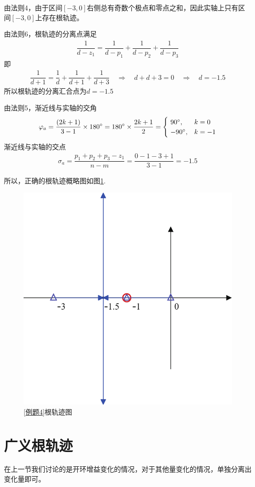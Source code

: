 由法则4，由于区间$[-3,0]$右侧总有奇数个极点和零点之和，因此实轴上只有区间$[-3,0]$上存在根轨迹。

由法则6，根轨迹的分离点满足
\begin{align*}
	\dfrac{1}{d - z_1} = \dfrac{1}{d - p_1} + \dfrac{1}{d - p_2} + \dfrac{1}{d - p_3}
\end{align*}
即
\begin{align*}
	\dfrac{1}{d +1} = \dfrac{1}{d} + \dfrac{1}{d + 1} + \dfrac{1}{d + 3} \quad \Rightarrow \quad 
	d + d + 3 = 0 \quad \Rightarrow \quad d = -1.5
\end{align*}
所以根轨迹的分离汇合点为$d = -1.5$

由法则5，渐近线与实轴的交角
\begin{align*}
	\varphi_a = \dfrac{(2k + 1)}{3 - 1} \times 180{}^{\circ} =180{}^{\circ}\times \dfrac{2k + 1}{2} = 
	\begin{cases}
		\,\, 90{}^{\circ}, &k = 0\\
		\,\, -90 {}^{\circ}, & k = -1
	\end{cases} 
\end{align*}
渐近线与实轴的交点
\begin{align*}
	\sigma_a = \dfrac{p_1 + p_2 + p_3 - z_1}{n - m} = \dfrac{0 -1 - 3 +1}{3 - 1} = -1.5
\end{align*}

所以，正确的根轨迹概略图如图\ref{例题4根轨迹图}.
\begin{figure}[!htb]
	\centering
	\includegraphics[width=0.45\linewidth]{pic/例题4图.pdf}
	\caption{\ref{例题4}根轨迹图}
	\label{例题4根轨迹图}
\end{figure}




\section{广义根轨迹}
在上一节我们讨论的是开环增益变化的情况，对于其他量变化的情况，单独分离出变化量即可。
\vspace*{0.5em}

